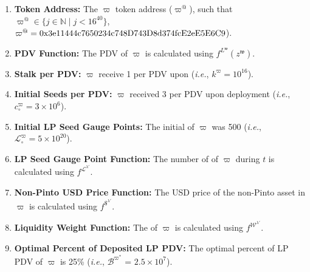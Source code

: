 \documentclass[class=article, crop=false]{standalone}
\begin{document}
\begin{enumerate}

    \item \textbf{Token Address:} The $\varpi$ token address ($\varpi^{@}$), such that $\varpi^{@} \in \{j \in \mathbb{N} \mid j < 16^{40} \}$, $\varpi^{@} = \\ \text{0x3e11444c7650234c748D743D8d374fcE2eE5E6C9}$).
    
    \item \textbf{PDV Function:} The PDV of $\varpi$ is calculated using $f^{L^{\mathfrak{w}}}(z^{\mathfrak{w}})$.
                
    \item \textbf{Stalk per PDV:} $\varpi$  receive 1  per PDV upon  (\textit{i.e.}, $k^{\varpi} = 10^{16}$).
    
    \item \textbf{Initial Seeds per PDV:} $\varpi$  received 3  per PDV upon deployment (\textit{i.e.}, ${c_{\circ}^{\varpi}} = 3 \times 10^6$).

    \item \textbf{Initial LP Seed Gauge Points:} The initial  of $\varpi$ was 500 (\textit{i.e.}, $\mathscr{L}_{\circ}^{\varpi} = 5 \times 10^{20}$).
    
    \item \textbf{LP Seed Gauge Point Function:} The number of  of $\varpi$ during $t$ is calculated using $f^{\mathscr{L}^{\lambda'}}$.

    \item \textbf{Non-Pinto USD Price Function:} The USD price of the non-Pinto asset in $\varpi$ is calculated using $f^{\$^{\lambda'}}$.

    \item \textbf{Liquidity Weight Function:} The  of $\varpi$ is calculated using $f^{\mathscr{W}^{\lambda'}}$.
    
    \item \textbf{Optimal Percent of Deposited LP PDV:} The optimal percent of  LP PDV of $\varpi$ is 25\% (\textit{i.e.}, $\mathscr{B}^{\varpi^{*}}$ = $2.5 \times 10^{7}$).


\end{enumerate}
\end{document}

